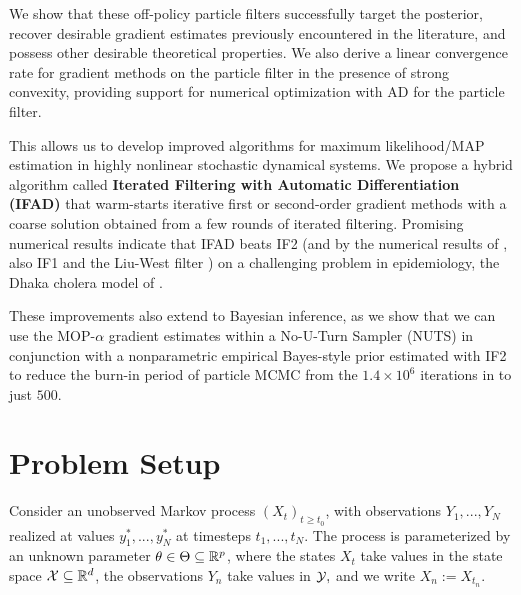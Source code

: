 \documentclass[9pt,twocolumn,twoside]{pnas-new}
\begin{document}
We show that these off-policy particle filters successfully target the posterior, recover desirable gradient estimates previously encountered in the literature, and possess other desirable theoretical properties. We also derive a linear convergence rate for gradient methods on the particle filter in the presence of strong convexity, providing support for numerical optimization with AD for the particle filter. 

This allows us to develop improved algorithms for maximum likelihood/MAP estimation in highly nonlinear stochastic dynamical systems. We propose a hybrid algorithm called \textbf{Iterated Filtering with Automatic Differentiation (IFAD)} that warm-starts iterative first or second-order gradient methods with a coarse solution obtained from a few rounds of iterated filtering. Promising numerical results indicate that IFAD beats IF2 (and by the numerical results of \cite{ionides15}, also IF1 and the Liu-West filter \cite{liuwest01}) on a challenging problem in epidemiology, the Dhaka cholera model of \cite{king08}.

These improvements also extend to Bayesian inference, as we show that we can use the MOP-$\alpha$ gradient estimates within a No-U-Turn Sampler (NUTS) \cite{homan14} in conjunction with a nonparametric empirical Bayes-style prior estimated with IF2 to reduce the burn-in period of particle MCMC \cite{doucet2010pmcmc} from the $1.4 \times 10^6$ iterations in \cite{fasiolo16} to just $500$. 

\section{Problem Setup}

Consider an unobserved Markov process $(X_t)_{t \geq t_0}$, with observations $Y_1,...,Y_N$ realized at values $y_1^*,...,y_N^*$ at timesteps $t_1,..., t_N$. The process is parameterized by an unknown parameter $\theta \in \Theta \subseteq \mathbb{R}^p$, where the states $X_t$ take values in the state space ${\mathcal{X}} \subseteq \mathbb{R}^d$, the observations $Y_n$ take values in ${\mathcal{Y}},$ and we write $X_n := X_{t_n}$. 

\end{document}
